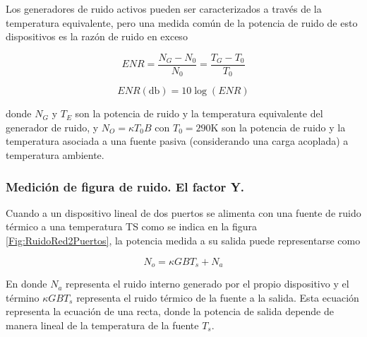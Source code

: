 \documentclass{article}
\begin{document}
	Los generadores de ruido activos pueden ser caracterizados a través de la temperatura equivalente, pero  una medida común de la potencia de ruido de esto dispositivos es la razón de ruido en exceso
	
	\begin{equation}
		ENR = \frac{N_G-N_0}{N_0} = \frac{T_G - T_0}{T_0}
	\end{equation}
	
	\begin{equation}
		ENR(\si{\decibel}) = 10\log(ENR)
	\end{equation}	
	
	\noindent donde $N_G$ y $T_E$ son la potencia de ruido y la temperatura equivalente del generador de ruido, y $N_O = {\kappa}T_0B$ con $T_0 = 290\si{\kelvin}$ son la potencia de ruido y la temperatura asociada a una fuente pasiva (considerando una carga acoplada) a temperatura ambiente.
	
	\subsubsection{Medición de figura de ruido. El factor Y.}	
	
	Cuando a un dispositivo lineal de dos puertos se alimenta con una fuente de ruido térmico a una temperatura TS como se indica en la figura \ref{Fig:RuidoRed2Puertos}, la potencia  medida a su salida puede representarse como	
	
	\begin{equation}
		N_o = {\kappa}GBT_s + N_a 
	\end{equation}
	
	\noindent En donde $N_a$ representa el ruido interno generado por el propio dispositivo y el término ${\kappa}GBT_s$ representa el ruido térmico de la fuente a la salida. Esta ecuación representa la ecuación de una recta, donde la potencia de salida depende de manera lineal de la temperatura de la fuente $T_s$.
	
\end{document}
